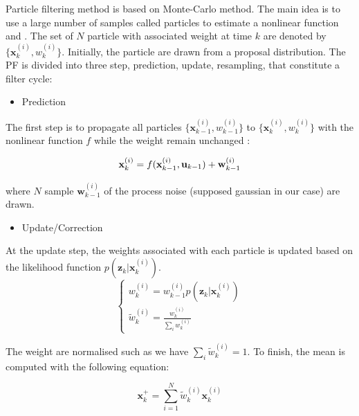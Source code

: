 \documentclass[conference]{IEEEtran}
\begin{document}
Particle filtering method is based on Monte-Carlo method\cite{metropolis1949monte}. The main idea is to use a large number of samples called particles to estimate a nonlinear function \cite{chen_bayesian_2003} and \cite{terejanu2009tutorial}. The set of $N$ particle with associated weight at time $k$ are denoted by $\{\textbf{x}^{(i)}_{k},w^{(i)}_{k}\}$. Initially, the particle are drawn from a proposal distribution. The PF is divided into three step, prediction, update, resampling, that constitute a filter cycle:

\begin{itemize}
\item Prediction
\end{itemize}

The first step is to propagate all particles $\{\textbf{x}^{(i)}_{k-1},w^{(i)}_{k-1}\}$ to $\{\textbf{x}^{(i)}_{k},w^{(i)}_{k}\}$ with the nonlinear function $f$ while the weight remain unchanged : 

\begin{equation}
\textbf{x}^{(i)}_{k} = f(\textbf{x}^{(i)}_{k-1},\textbf{u}_{k-1}) + \textbf{w}_{k-1}^{(i)}\\
\end{equation}

where $N$ sample $\textbf{w}_{k-1}^{(i)}$ of the process noise (supposed gaussian in our case) are drawn.

\begin{itemize}
\item Update/Correction
\end{itemize}

At the update step, the weights associated with each particle is updated based on the likelihood function $p( \textbf{z}_k| \textbf{x}_k^{(i)})$.
\begin{equation}
\left\{ 
\begin{array}{l}
w_k^{(i)} = w_{k-1}^{(i)} p( \textbf{z}_k| \textbf{x}_k^{(i)})\\
\tilde{w}_k^{(i)} = \frac{w_{k}^{(i)}}{\sum_iw_{k}^{(i)}}
\end{array}
\right.
\end{equation}

The weight are normalised such as we have $\sum_i\tilde{w}_k^{(i)}=1$. To finish, the mean is computed with the following equation:

\begin{equation}
 \textbf{x}_k^+ = \sum_{i=1}^N\tilde{w}_k^{(i)} \textbf{x}_k^{(i)}
 \end{equation}
\end{document}
